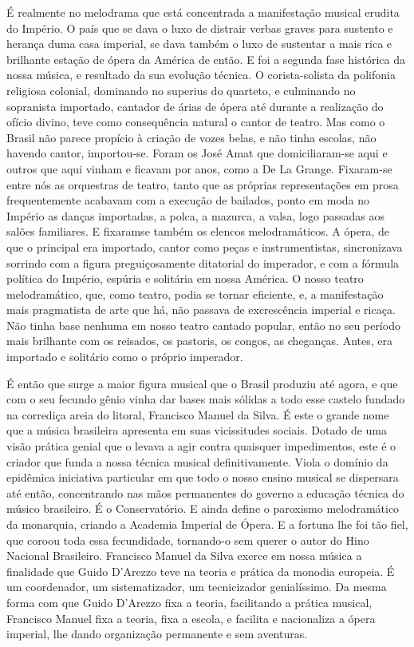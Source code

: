 É realmente no melodrama que está concentrada a manifestação musical
erudita do Império. O país que se dava o luxo de distrair verbas graves
para sustento e herança duma casa imperial, se dava também o luxo de
sustentar a mais rica e brilhante estação de ópera da América de então.
E foi a segunda fase histórica da nossa música, e resultado da sua
evolução técnica. O corista-solista da polifonia religiosa colonial,
dominando no superius do quarteto, e culminando no sopranista importado,
cantador de árias de ópera até durante a realização do ofício divino,
teve como consequência natural o cantor de teatro. Mas como o Brasil não
parece propício à criação de vozes belas, e não tinha escolas, não
havendo cantor, importou-se. Foram os José Amat que domiciliaram-se aqui
e outros que aqui vinham e ficavam por anos, como a De La Grange.
Fixaram-se entre nós as orquestras de teatro, tanto que as próprias
representações em prosa frequentemente acabavam com a execução de
bailados, ponto em moda no Império as danças importadas, a polca, a
mazurca, a valsa, logo passadas aos salões familiares. E fixaramse
também os elencos melodramáticos. A ópera, de que o principal era
importado, cantor como peças e instrumentistas, sincronizava sorrindo
com a figura preguiçosamente ditatorial do imperador, e com a fórmula
política do Império, espúria e solitária em nossa América. O nosso
teatro melodramático, que, como teatro, podia se tornar eficiente, e, a
manifestação mais pragmatista de arte que há, não passava de
excrescência imperial e ricaça. Não tinha base nenhuma em nosso teatro
cantado popular, então no seu período mais brilhante com os reisados, os
pastoris, os congos, as cheganças. Antes, era importado e solitário como
o próprio imperador.

É então que surge a maior figura musical que o Brasil produziu até
agora, e que com o seu fecundo gênio vinha dar bases mais sólidas a todo
esse castelo fundado na corrediça areia do litoral, Francisco Manuel da
Silva. É este o grande nome que a música brasileira apresenta em suas
vicissitudes sociais. Dotado de uma visão prática genial que o levava a
agir contra quaisquer impedimentos, este é o criador que funda a nossa
técnica musical definitivamente. Viola o domínio da epidêmica iniciativa
particular em que todo o nosso ensino musical se dispersara até então,
concentrando nas mãos permanentes do governo a educação técnica do
músico brasileiro. É o Conservatório. E ainda define o paroxismo
melodramático da monarquia, criando a Academia Imperial de Ópera. E a
fortuna lhe foi tão fiel, que coroou toda essa fecundidade, tornando-o
sem querer o autor do Hino Nacional Brasileiro. Francisco Manuel da
Silva exerce em nossa música a finalidade que Guido D'Arezzo teve na
teoria e prática da monodia europeia. É um coordenador, um
sistematizador, um tecnicizador genialíssimo. Da mesma forma com que
Guido D'Arezzo fixa a teoria, facilitando a prática musical, Francisco
Manuel fixa a teoria, fixa a escola, e facilita e nacionaliza a ópera
imperial, lhe dando organização permanente e sem aventuras.


